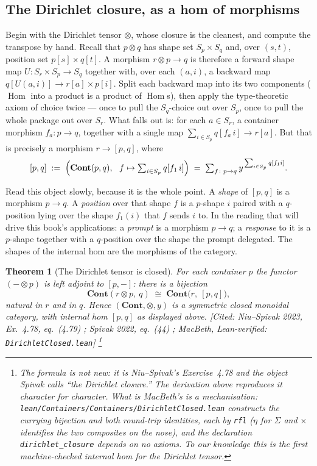 \documentclass[11pt,a4paper]{book}
\newcommand{\Cont}{\mathbf{Cont}}
\DeclareMathOperator{\Hom}{Hom}
\theoremstyle{plain}
\newtheorem{Theorem}{Theorem}[chapter]
\theoremstyle{definition}
\theoremstyle{remark}
\newcommand{\prov}[1]{\hfill\textsf{\footnotesize[#1]}}
\begin{document}
\subsection{The Dirichlet closure, as a hom of morphisms}

Begin with the Dirichlet tensor $\otimes$, whose closure is the cleanest, and
compute the transpose by hand. Recall that $p\otimes q$ has shape set
$S_p\times S_q$ and, over $(s,t)$, position set $p[s]\times q[t]$. A morphism
$r\otimes p\to q$ is therefore a forward shape map
$U\colon S_r\times S_p\to S_q$ together with, over each $(a,i)$, a backward map
$q[U(a,i)]\to r[a]\times p[i]$. Split each backward map into its two components
($\Hom$ into a product is a product of $\Hom$s), then apply the type-theoretic
axiom of choice twice --- once to pull the $S_q$-choice out over $S_p$, once to
pull the whole package out over $S_r$. What falls out is: for each $a\in S_r$, a
container morphism $f_a\colon p\to q$, together with a single map
$\sum_{i\in S_p}q[f_a\,i]\to r[a]$. But that is precisely a morphism
$r\to[p,q]$, where
\[
   [p,q]\;:=\;\Bigl(\Cont(p,q),\ \ f\mapsto\textstyle\sum_{i\in S_p}q[f_1\,i]\Bigr)
   \;=\;\sum_{f\colon p\to q}y^{\,\sum_{i\in S_p}q[f_1 i]} .
\]

Read this object slowly, because it is the whole point. A \emph{shape} of $[p,q]$
is a morphism $p\to q$. A \emph{position} over that shape $f$ is a $p$-shape $i$
paired with a $q$-position lying over the shape $f_1(i)$ that $f$ sends $i$ to. In
the reading that will drive this book's applications: a \emph{prompt} is a
morphism $p\to q$; a \emph{response} to it is a $p$-shape together with a
$q$-position over the shape the prompt delegated. The shapes of the internal hom
are the morphisms of the category.

\begin{Theorem}[The Dirichlet tensor is closed]\label{thm:dirclosed}
For each container $p$ the functor $(-\otimes p)$ is left adjoint to $[p,-]$:
there is a bijection
\[
   \Cont(r\otimes p,\ q)\;\cong\;\Cont\bigl(r,\ [p,q]\bigr),
\]
natural in $r$ and in $q$. Hence $(\Cont,\otimes,y)$ is a symmetric closed
monoidal category, with internal hom $[p,q]$ as displayed above.
\prov{Cited: Niu--Spivak 2023, Ex.~4.78, eq.~(4.79) \cite{NiuSpivak23};
Spivak 2022, eq.~(44) \cite{SpivakRef}; MacBeth, Lean-verified:
\texttt{DirichletClosed.lean}}%
\footnote{The formula is not new: it is Niu--Spivak's Exercise~4.78 and the
object Spivak calls ``the Dirichlet closure.'' The derivation above reproduces it
character for character. What is MacBeth's is a mechanisation:
\texttt{lean/Containers/Containers/DirichletClosed.lean} constructs the currying
bijection and both round-trip identities, each by \texttt{rfl}
($\eta$ for $\Sigma$ and $\times$ identifies the two composites on the nose), and
the declaration \texttt{dirichlet\_closure} depends on no axioms. To our knowledge
this is the first machine-checked internal hom for the Dirichlet tensor.}
\end{Theorem}
\end{document}
